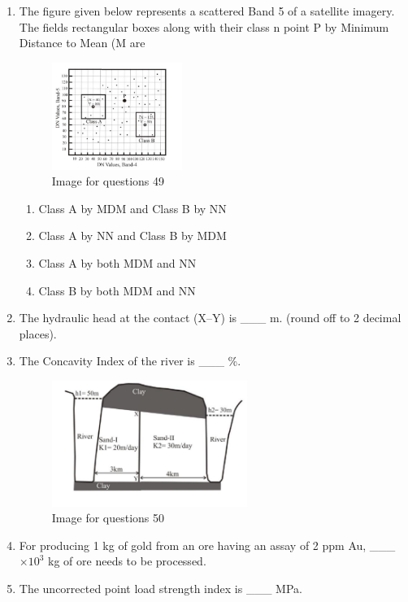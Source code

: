 \documentclass[journal,12pt,onecolumn]{IEEEtran}
\theoremstyle{remark}
\begin{document}
\begin{enumerate}
\item The figure given below represents a scattered Band 5 of a satellite imagery. The fields rectangular boxes along with their class n point P by Minimum Distance to Mean (M
are

\begin{figure}[H]
    \centering
    \includegraphics[width=0.4\textwidth]{figs/fig2.png}
    \caption{Image for questions 49}
    \label{fig:question49}
\end{figure}

\begin{enumerate}
\item Class A by MDM and Class B by NN
\item Class A by NN and Class B by MDM
\item Class A by both MDM and NN
\item Class B by both MDM and NN
\end{enumerate}

\item The hydraulic head at the contact (X--Y) is \_\_\_ m. (round off to 2 decimal places).  
\vspace{0.5cm}

\item The Concavity Index of the river is \_\_\_ \%.  
\vspace{0.5cm}

\begin{figure}[H]
    \centering
    \includegraphics[width=0.6\textwidth]{figs/fig3.png}
    \caption{Image for questions 50}
    \label{fig:question50}
\end{figure}




\item For producing 1 kg of gold from an ore having an assay of 2 ppm Au, \_\_\_ $\times 10^3$ kg of ore needs to be processed.  
\vspace{0.5cm}

\item The uncorrected point load strength index is \_\_\_ MPa.  
\vspace{0.5cm}
\end{enumerate}
\end{document}
